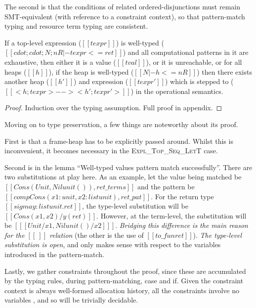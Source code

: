 The second is that the conditions of related ordered-disjunctions must remain
SMT-equivalent (with reference to a constraint context), so that pattern-match
typing and resource term typing are consistent.

\begin{theorem}
If a top-level expression ($[[ texpr ]]$) is well-typed
($[[ cdot ; cdot ; N ; nR |- texpr <= ret ]]$) and all computational patterns
in it are exhaustive, then either it is a value ($[[ tval ]]$), or it is
unreachable, or for all heaps ($[[ h ]]$), if the heap is well-typed
($[[ N |- h <= nR ]]$) then there exists another heap ($[[ h' ]]$) and expression
($[[ texpr' ]]$) which is stepped to ($[[ < h ; texpr > --> < h' ; texpr' > ]]$)
in the operational semantics.
\end{theorem}

\begin{proof}
Induction over the typing assumption. Full proof in appendix.
\end{proof}

Moving on to type preservation, a few things are noteworthy about its proof.

First is that a frame-heap has to be explicitly passed around.  Whilst this is
inconvenient, it becomes necessary in the \textsc{Expl\_Top\_Seq\_LetT} case.

Second is in the lemma ``Well-typed values pattern match successfully''. %
There are two substitutions at play here. As an example, let
the value being matched be $[[ Cons ( Unit , Nil unit ( ) ) , ret\_terms ]]$ and
the pattern be $[[ comp Cons ( x1 : unit , x2 : list unit ) , ret\_pat ]]$.
For the return type $[[ sigma y : list unit . ret ]]$, the type-level
substitution will be $[[ Cons ( x1 , x2 ) / y ( ret )]]$.  However, at the
term-level, the substitution will be $[[ [ Unit / x1 , Nil unit ( ) / x2 ] ]]$.
\emph{Bridging this difference is the main reason for the $[[ ~ ]]$ relation}
(the other is the use of $[[ to\_fun ret ]]$).  \emph{The type-level substitution
is open}, and only makes sense with respect to the variables introduced in the
pattern-match.

Lastly, we gather constraints throughout the proof, since these are accumulated
by the typing rules, during pattern-matching, case and if. Given the constraint
context is always well-formed
allocation history, all the constraints involve no variables
, and so will be trivially decidable.

